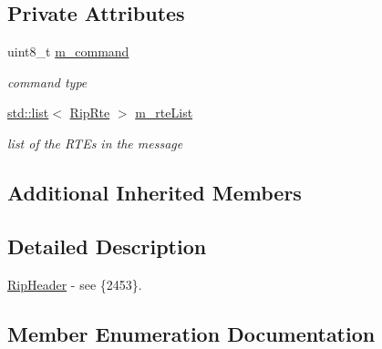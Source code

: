 \subsection*{Private Attributes}
\begin{DoxyCompactItemize}
\item 
uint8\+\_\+t \hyperlink{classns3_1_1RipHeader_a9535df7f0bb247eb7a975806a68d932e}{m\+\_\+command}
\begin{DoxyCompactList}\small\item\em command type \end{DoxyCompactList}\item 
\hyperlink{openflow-interface_8h_afd9bcfa176617760671b67580f536fa7}{std\+::list}$<$ \hyperlink{classns3_1_1RipRte}{Rip\+Rte} $>$ \hyperlink{classns3_1_1RipHeader_a7dbfd5c554354b9d2ac9800177a7f420}{m\+\_\+rte\+List}
\begin{DoxyCompactList}\small\item\em list of the R\+T\+Es in the message \end{DoxyCompactList}\end{DoxyCompactItemize}
\subsection*{Additional Inherited Members}


\subsection{Detailed Description}
\hyperlink{classns3_1_1RipHeader}{Rip\+Header} -\/ see \{2453\}. 

\subsection{Member Enumeration Documentation}
